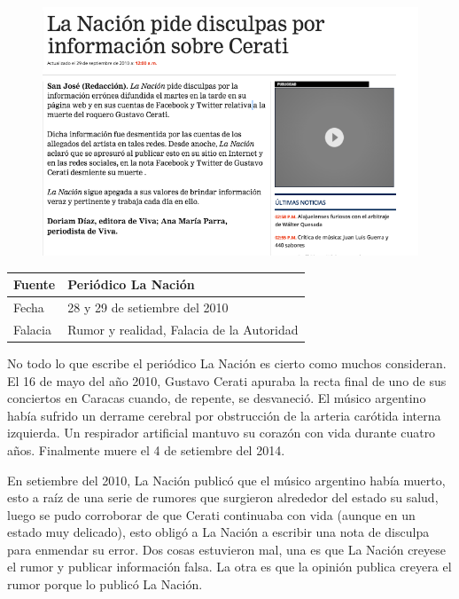 \documentclass[times]{simauth}
\begin{document}
\begin{figure}[h!]
    \centering
    \includegraphics[width=14.5cm]{cerati}
    \label{fig:falacia10}
\end{figure}

\begin{table}[h!]
    \begin{tabular}{ll} 
        \toprule[1.5pt]
        Fuente & Periódico La Nación\\
        \midrule[0.5pt]
        Fecha  & 28 y 29 de setiembre del 2010\\
        \midrule[0.5pt]
        Falacia & Rumor y realidad, Falacia de la Autoridad\\
        \bottomrule[1.5pt]
    \end{tabular} 
\end{table}

No todo lo que escribe el periódico La Nación es cierto como muchos consideran. El 16 de mayo del año 2010, Gustavo Cerati apuraba la recta final de uno de sus conciertos en Caracas cuando, de repente, se desvaneció. El músico argentino había sufrido un derrame cerebral por obstrucción de la arteria carótida interna izquierda. Un respirador artificial mantuvo su corazón con vida durante cuatro años. Finalmente muere el 4 de setiembre del 2014.

En setiembre del 2010, La Nación publicó que el músico argentino había muerto, esto a raíz de una serie de rumores que surgieron alrededor del estado su salud, luego se pudo corroborar de que Cerati continuaba con vida (aunque en un estado muy delicado), esto obligó a La Nación a escribir una nota de disculpa para enmendar su error. Dos cosas estuvieron mal, una es que La Nación creyese el rumor y publicar información falsa. La otra es que la opinión publica creyera el rumor porque lo publicó La Nación. 
\end{document}
